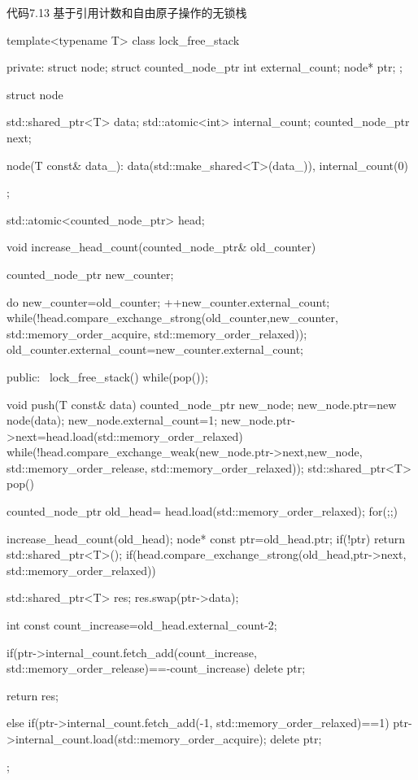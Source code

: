 代码7.13 基于引用计数和自由原子操作的无锁栈

\begin{cpp}
template<typename T>
class lock_free_stack
{
private:
  struct node;
  struct counted_node_ptr
  {
    int external_count;
    node* ptr;
  };

  struct node
  {
    std::shared_ptr<T> data;
    std::atomic<int> internal_count;
    counted_node_ptr next;

    node(T const& data_):
      data(std::make_shared<T>(data_)),
      internal_count(0)
    {}
  };

  std::atomic<counted_node_ptr> head;

  void increase_head_count(counted_node_ptr& old_counter)
  {
    counted_node_ptr new_counter;

    do
    {
      new_counter=old_counter;
      ++new_counter.external_count;
    }
    while(!head.compare_exchange_strong(old_counter,new_counter,
                                        std::memory_order_acquire,
                                        std::memory_order_relaxed));
    old_counter.external_count=new_counter.external_count;
  }
public:
  ~lock_free_stack()
  {
    while(pop());
  }

  void push(T const& data)
  {
    counted_node_ptr new_node;
    new_node.ptr=new node(data);
    new_node.external_count=1;
    new_node.ptr->next=head.load(std::memory_order_relaxed)
    while(!head.compare_exchange_weak(new_node.ptr->next,new_node,
                                      std::memory_order_release,
                                      std::memory_order_relaxed));
  }
  std::shared_ptr<T> pop()
  {
    counted_node_ptr old_head=
       head.load(std::memory_order_relaxed);
    for(;;)
    {
      increase_head_count(old_head);
      node* const ptr=old_head.ptr;
      if(!ptr)
      {
        return std::shared_ptr<T>();
      }
      if(head.compare_exchange_strong(old_head,ptr->next,
                                      std::memory_order_relaxed))
      {
        std::shared_ptr<T> res;
        res.swap(ptr->data);

        int const count_increase=old_head.external_count-2;

        if(ptr->internal_count.fetch_add(count_increase,
              std::memory_order_release)==-count_increase)
        {
          delete ptr;
        }

        return res;
      }
      else if(ptr->internal_count.fetch_add(-1,
                   std::memory_order_relaxed)==1)
      {
        ptr->internal_count.load(std::memory_order_acquire);
        delete ptr;
      }
    }
  }
};
\end{cpp}

